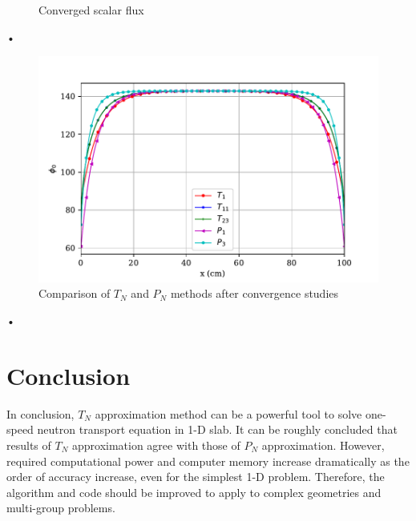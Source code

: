\documentclass[11pt]{article}
\begin{document}
\begin{spacing}{1.5}
\begin{figure}[htbp]
\begin{minipage}[t]{0.5\textwidth}
\caption{Converged scalar flux}\label{fig:conv_flux}
\end{minipage}
\end{figure}•
\begin{figure}[htbp]
\centering
\includegraphics{TP_comp_final_2.pdf}
\caption{Comparison of $T_N$ and $P_N$ methods after convergence studies}\label{fig:comp_final}
\end{figure}•
\section{Conclusion}
In conclusion, $T_N$ approximation method can be a powerful tool to solve one-speed neutron transport equation in 1-D slab. It can be roughly concluded that results of $T_N$ approximation  agree with those of $P_N$ approximation. However, required computational power and computer memory increase dramatically as the order of accuracy increase, even for the simplest 1-D problem. Therefore, the algorithm and code should be improved to apply to complex geometries and multi-group problems.
\newpage



\end{spacing}
\end{document}
